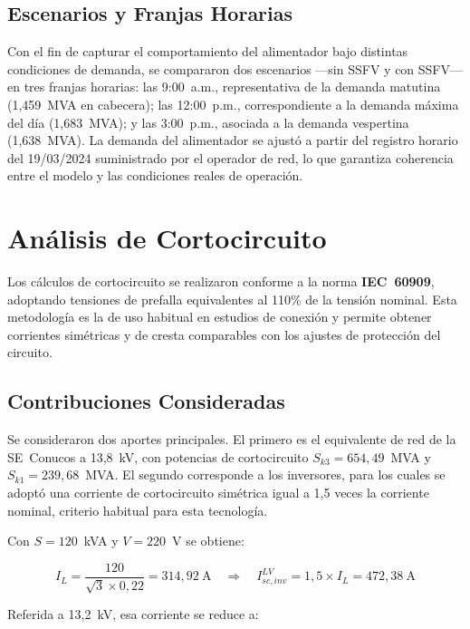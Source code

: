 \subsection{Escenarios y Franjas Horarias}

Con el fin de capturar el comportamiento del alimentador bajo distintas condiciones de demanda, se compararon dos escenarios ---sin SSFV y con SSFV--- en tres franjas horarias: las 9:00~a.m., representativa de la demanda matutina (1,459~MVA en cabecera); las 12:00~p.m., correspondiente a la demanda máxima del día (1,683~MVA); y las 3:00~p.m., asociada a la demanda vespertina (1,638~MVA). La demanda del alimentador se ajustó a partir del registro horario del 19/03/2024 suministrado por el operador de red, lo que garantiza coherencia entre el modelo y las condiciones reales de operación.

\section{Análisis de Cortocircuito}

Los cálculos de cortocircuito se realizaron conforme a la norma \textbf{IEC~60909}, adoptando tensiones de prefalla equivalentes al 110\% de la tensión nominal. Esta metodología es la de uso habitual en estudios de conexión y permite obtener corrientes simétricas y de cresta comparables con los ajustes de protección del circuito.

\subsection{Contribuciones Consideradas}

Se consideraron dos aportes principales. El primero es el equivalente de red de la SE~Conucos a 13,8~kV, con potencias de cortocircuito $S_{k3}=654,49$~MVA y $S_{k1}=239,68$~MVA. El segundo corresponde a los inversores, para los cuales se adoptó una corriente de cortocircuito simétrica igual a 1,5 veces la corriente nominal, criterio habitual para esta tecnología.

Con $S=120$~kVA y $V=220$~V se obtiene:

\begin{equation}
I_{L} = \frac{120}{\sqrt{3}\times 0{,}22} = 314{,}92~\text{A}
\quad\Rightarrow\quad
I_{sc,inv}^{LV} = 1{,}5\times I_{L} = 472{,}38~\text{A}
\end{equation}

Referida a 13,2~kV, esa corriente se reduce a:

